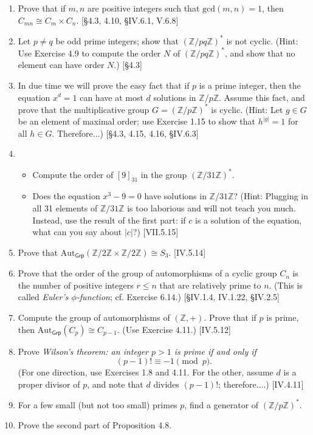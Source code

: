 \begin{enumerate}
    \item Prove that if $m, n$ are positive integers such that $\text{gcd}(m, n)=1$, then $C_{mn} \cong C_m \times C_n$. [\S4.3, 4.10, \S IV.6.1, V.6.8]

    \item Let $p \ne q$ be odd prime integers; show that $(\mathbb{Z}/pq\mathbb{Z})^*$ is not cyclic. (Hint: Use Exercise 4.9 to compute the order $N$ of $(\mathbb{Z}/pq\mathbb{Z})^*$, and show that no element can have order $N$.) [\S4.3]

    \item In due time we will prove the easy fact that if $p$ is a prime integer, then the equation $x^d = 1$ can have at most $d$ solutions in $\mathbb{Z}/p\mathbb{Z}$. Assume this fact, and prove that the multiplicative group $G = (\mathbb{Z}/p\mathbb{Z})^*$ is cyclic. (Hint: Let $g \in G$ be an element of maximal order; use Exercise 1.15 to show that $h^{|g|} = 1$ for all $h \in G$. Therefore...) [\S4.3, 4.15, 4.16, \S IV.6.3]

    \item
          \begin{itemize}
              \item     Compute the order of $[9]_{31}$ in the group $(\mathbb{Z}/31\mathbb{Z})^*$.
              \item Does the equation $x^3 - 9 = 0$ have solutions in $\mathbb{Z}/31\mathbb{Z}$? (Hint: Plugging in all 31 elements of $\mathbb{Z}/31\mathbb{Z}$ is too laborious and will not teach you much. Instead, use the result of the first part: if $c$ is a solution of the equation, what can you say about $|c|$?) [VII.5.15]
          \end{itemize}

    \item Prove that $\text{Aut}_{\mathsf{Grp}}(\mathbb{Z}/2\mathbb{Z} \times \mathbb{Z}/2\mathbb{Z}) \cong S_3$. [IV.5.14]

    \item Prove that the order of the group of automorphisms of a cyclic group $C_n$ is the number of positive integers $r \le n$ that are relatively prime to $n$. (This is called \emph{Euler's $\phi$-function}; cf. Exercise 6.14.) [\S IV.1.4, IV.1.22, \S IV.2.5]

    \item Compute the group of automorphisms of $(\mathbb{Z}, +)$. Prove that if $p$ is prime, then $\text{Aut}_{\mathsf{Grp}}(C_p) \cong C_{p-1}$. (Use Exercise 4.11.) [IV.5.12]

    \item Prove \emph{Wilson's theorem: an integer $p > 1$ is prime if and only if}
          \[ (p-1)! \equiv -1 \pmod p. \]
          (For one direction, use Exercises 1.8 and 4.11. For the other, assume $d$ is a proper divisor of $p$, and note that $d$ divides $(p-1)!$; therefore....) [IV.4.11]

    \item For a few small (but not too small) primes $p$, find a generator of $(\mathbb{Z}/p\mathbb{Z})^*$.

    \item Prove the second part of Proposition 4.8.
\end{enumerate}